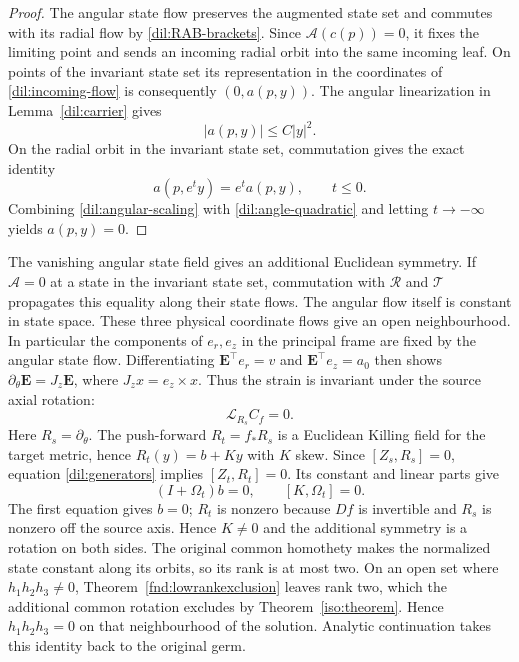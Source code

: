 \documentclass[11pt,a4paper]{article}
\numberwithin{equation}{section}
\theoremstyle{plain}
\theoremstyle{definition}
\theoremstyle{remark}
\begin{document}
\begin{proof}
The angular state flow preserves the augmented state set and
commutes with its radial flow by \eqref{dil:RAB-brackets}.  Since
$\mathcal A(c(p))=0$, it fixes the limiting point and sends an
incoming radial orbit into the same incoming leaf.  On points of the invariant state set its representation in the coordinates of
\eqref{dil:incoming-flow} is consequently $(0,a(p,y))$.
The angular linearization in Lemma~\ref{dil:carrier} gives
\begin{equation}\label{dil:angle-quadratic}
                         |a(p,y)|\le C|y|^2.
\end{equation}
On the radial orbit in the invariant state set, commutation gives the exact identity
\begin{equation}\label{dil:angular-scaling}
                    a(p,e^ty)=e^ta(p,y),\qquad t\le0.
\end{equation}
Combining \eqref{dil:angular-scaling} with \eqref{dil:angle-quadratic} and letting
$t\to-\infty$ yields $a(p,y)=0$. 
\end{proof}

The vanishing angular state field gives an additional Euclidean
symmetry.  If $\mathcal A=0$ at a state in the invariant state set, commutation
with $\mathcal R$ and $\mathcal T$ propagates this equality along their
state flows.  The angular flow itself is constant in state space.
These three physical coordinate flows give an open neighbourhood.
In particular the components of $e_r,e_z$ in the principal frame are
fixed by the angular state flow.  Differentiating
$\mathbf E^{\top}e_r=v$ and $\mathbf E^{\top}e_z=a_0$ then shows
$\partial_\theta \mathbf E=J_z\mathbf E$, where $J_zx=e_z\times x$.
Thus the strain is invariant under the source axial rotation:
\begin{equation}\label{dil:second-rotation}
                         \mathcal L_{R_s}C_f=0.
\end{equation}
Here $R_s=\partial_\theta$. The push-forward $R_t=f_*R_s$ is a Euclidean Killing field for the
target metric, hence $R_t(y)=b+Ky$ with $K$ skew.  Since
$[Z_s,R_s]=0$, equation \eqref{dil:generators} implies
$[Z_t,R_t]=0$.  Its constant and linear parts give
\[
                        (I+\Omega_t)b=0,\qquad
                        [K,\Omega_t]=0.
\]
The first equation gives $b=0$; $R_t$ is nonzero because $Df$ is
invertible and $R_s$ is nonzero off the source axis.  Hence $K\ne0$
and the additional symmetry is a rotation on both sides. The original
common homothety makes the normalized state constant along its orbits,
so its rank is at most two. On an open set where $h_1h_2h_3\ne0$,
Theorem~\ref{fnd:lowrankexclusion} leaves rank two, which the additional
common rotation excludes by Theorem~\ref{iso:theorem}.
Hence $h_1h_2h_3=0$ on that neighbourhood of the solution.
Analytic continuation takes this identity back
to the original germ.
\end{document}

